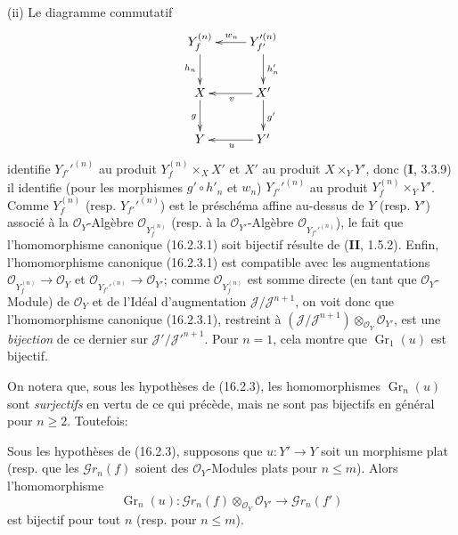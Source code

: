 \noindent(ii) Le diagramme commutatif
\[
  \xymatrix{
    Y_f^{(n)} \ar[d]_{h_n}
      & Y_{f'}'^{(n)} \ar[d]^-{h'_n} \ar[l]_{w_n} \\
    X \ar[d]_g
      & X' \ar[d]^{g'} \ar[l]^v \\
    Y
      & Y' \ar[l]^u
  }
\]
identifie $Y_{f'}'^{(n)}$ au produit $Y_f^{(n)}\times_X X'$ et $X'$ au produit
$X\times_Y Y'$, donc (\textbf{I}, 3.3.9) il identifie (pour les morphismes
$g'\circ h'_n$ et $w_n$) $Y_{f'}'^{(n)}$ au produit
$Y_f^{(n)}\times_Y Y'$. Comme $Y_f^{(n)}$ (resp. $Y_{f'}'^{(n)}$) est le
préschéma affine au-dessus de $Y$ (resp. $Y'$) associé à la
$\mathcal{O}_Y$-Algèbre $\mathcal{O}_{Y_f^{(n)}}$ (resp. à la
$\mathcal{O}_{Y'}$-Algèbre $\mathcal{O}_{Y_{f'}'^{(n)}}$), le fait que
l'homomorphisme canonique (16.2.3.1) soit bijectif résulte de (\textbf{II}, 1.5.2).
Enfin, l'homomorphisme canonique (16.2.3.1) est compatible avec les
augmentations
$\mathcal{O}_{Y_f^{(n)}}\to\mathcal{O}_Y$ et
$\mathcal{O}_{Y_{f'}'^{(n)}}\to\mathcal{O}_{Y'}$; comme
$\mathcal{O}_{Y_f^{(n)}}$ est somme directe (en tant que
$\mathcal{O}_Y$-Module) de $\mathcal{O}_Y$ et de l'Idéal d'augmentation
$\mathscr{J}/\mathscr{J}^{n+1}$, on voit donc que l'homomorphisme canonique
(16.2.3.1), restreint à
$(\mathscr{J}/\mathscr{J}^{n+1})\otimes_{\mathcal{O}_Y}\mathcal{O}_{Y'}$,
est une \emph{bijection} de ce dernier sur
$\mathscr{J}'/\mathscr{J}'^{n+1}$. Pour $n=1$, cela montre que
$\operatorname{Gr}_1(u)$ est bijectif.

On notera que, sous les hypothèses de (16.2.3), les homomorphismes
$\operatorname{Gr}_n(u)$ sont \emph{surjectifs} en vertu de ce qui précède, mais ne
sont pas bijectifs en général pour $n\geq 2$. Toutefois:

\begin{corollary}[16.2.4]
\label{IV.16.2.4}
Sous les hypothèses de \textup{(16.2.3)}, supposons que $u:Y'\to Y$ soit un morphisme
plat \textup{(resp.} que les $\mathscr{G}r_n(f)$ soient des $\mathcal{O}_Y$-Modules
plats pour $n\leq m$\textup{)}. Alors l'homomorphisme
\[
  \operatorname{Gr}_n(u):
  \mathscr{G}r_n(f)\otimes_{\mathcal{O}_Y}\mathcal{O}_{Y'}
  \longrightarrow\mathscr{G}r_n(f')
\]
est bijectif pour tout $n$ \textup{(resp.} pour $n\leq m$\textup{)}.
\end{corollary}

